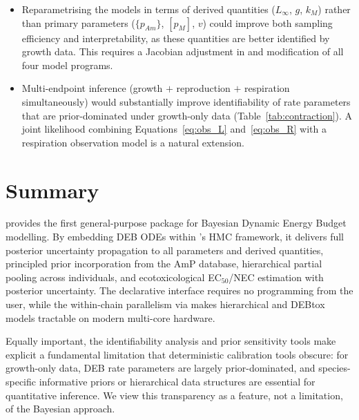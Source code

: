 \documentclass[article,shortnames]{jss}
\newcommand{\pAm}{\{p_{Am}\}}
\newcommand{\pM}{[p_M]}
\begin{document}
\begin{itemize}
    damage component ($D_w$, $z_w$, $b_w$) warrants dedicated
    validation.  Comprehensive SBC for the hierarchical and DEBtox
    models is planned for a future version.
  \item Reparametrising the  models in terms of
    derived quantities ($L_\infty$, $g$, $k_M$) rather than primary
    parameters ($\pAm$, $\pM$, $v$) could improve both sampling
    efficiency and interpretability, as these quantities are better
    identified by growth data.  This requires a Jacobian adjustment
    in  and modification of all four model programs.
  \item Multi-endpoint inference (growth $+$ reproduction $+$
    respiration simultaneously) would substantially improve
    identifiability of rate parameters that are prior-dominated
    under growth-only data (Table~\ref{tab:contraction}).  A joint
    likelihood combining Equations~\eqref{eq:obs_L}
    and~\eqref{eq:obs_R} with a respiration observation model is a
    natural extension.
\end{itemize}


\section{Summary} \label{sec:summary}

 provides the first general-purpose 
package for Bayesian Dynamic Energy Budget modelling.  By embedding
DEB ODEs within 's HMC framework, it delivers full
posterior uncertainty propagation to all parameters and derived
quantities, principled prior incorporation from the AmP database,
hierarchical partial pooling across individuals, and ecotoxicological
EC$_{50}$/NEC estimation with posterior uncertainty.  The declarative
 interface requires no  programming from
the user, while the within-chain parallelism via 
makes hierarchical and DEBtox models tractable on modern multi-core
hardware.

Equally important, the identifiability analysis and prior sensitivity
tools make explicit a fundamental limitation that deterministic
calibration tools obscure: for growth-only data, DEB rate parameters
are largely prior-dominated, and species-specific informative priors
or hierarchical data structures are essential for quantitative
inference.  We view this transparency as a feature, not a limitation,
of the Bayesian approach.
\end{document}
